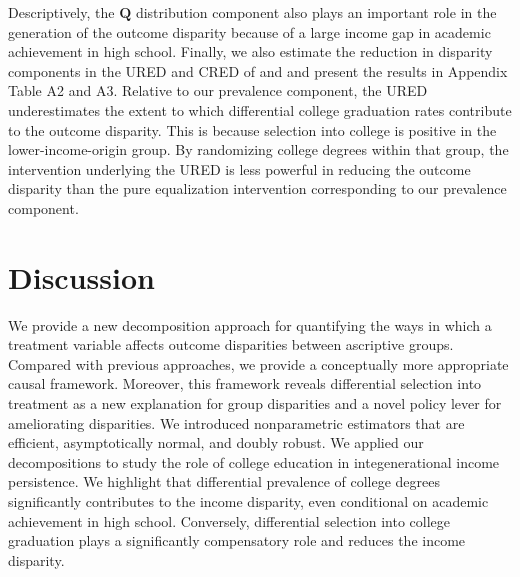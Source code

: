 \documentclass[12pt,a4paper]{article}
\def\Q{{\boldsymbol Q}}
\begin{document}
Descriptively, the $\Q$ distribution component also plays an important role in the generation of the outcome disparity because of a large income gap in academic achievement in high school. Finally, we also estimate the reduction in disparity components in the URED and CRED of \citet{jackson_decomposition_2018} and \citet{jackson_meaningful_2021} and present the results in Appendix Table A2 and A3. Relative to our prevalence component, the URED underestimates the extent to which differential college graduation rates contribute to the outcome disparity. This is because selection into college is positive in the lower-income-origin group. By randomizing college degrees within that group, the intervention underlying the URED is less powerful in reducing the outcome disparity than the pure equalization intervention corresponding to our prevalence component. 

\section{Discussion}
We provide a new decomposition approach for quantifying the ways in which a treatment variable affects outcome disparities between ascriptive groups. Compared with previous approaches, we provide a conceptually more appropriate causal framework. Moreover, this framework reveals differential selection into treatment as a new explanation for group disparities and a novel policy lever for ameliorating disparities. We introduced nonparametric estimators that are efficient, asymptotically normal, and doubly robust. We applied our decompositions to study the role of college education in integenerational income persistence. We highlight that differential prevalence of college degrees significantly contributes to the income disparity, even conditional on academic achievement in high school. Conversely, differential selection into college graduation plays a significantly compensatory role and reduces the income disparity.
\end{document}
